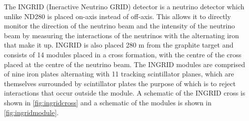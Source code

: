 The INGRID (Ineractive Neutrino GRID) detector is a neutrino detector which unlike ND280 is placed on-axis instead of off-axis. This allows it to directly monitor the direction of the neutrino beam and the intensity of the neutrino beam by measuring the interactions of the neutrinos with the alternating iron that make it up. INGRID is also placed 280 m from the graphite target and consists of 14 modules placed in a cross formation, with the centre of the cross placed at the centre of the neutrino beam. The INGRID modules are comprised of nine iron plates alternating with 11 tracking scintillator planes, which are themselves surrounded by scintillator plates the purpose of which is to reject interactions that occur outside the module. A schematic of the INGRID cross is shown in \ref{fig:ingridcross} and a schematic of the modules is shown in \ref{fig:ingridmodule}. 

